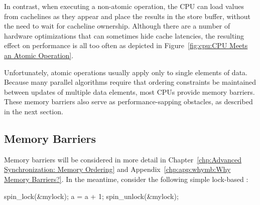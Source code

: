 In contrast, when executing a non-atomic operation, the CPU can load
values from cachelines as they appear and place the results in the
store buffer, without the need to wait for cacheline ownership.
Although there are a number of hardware optimizations that can sometimes
hide cache latencies, the resulting effect on performance is all too
often as depicted in
Figure~\ref{fig:cpu:CPU Meets an Atomic Operation}.

Unfortunately, atomic operations usually apply only to single elements
of data.
Because many parallel algorithms require that ordering constraints
be maintained between updates of multiple data elements, most CPUs
provide memory barriers.
These memory barriers also serve as performance-sapping obstacles,
as described in the next section.

\QuickQuizEnd

\subsection{Memory Barriers}
\label{sec:cpu:Memory Barriers}

Memory barriers will be considered in more detail in
Chapter~\ref{chp:Advanced Synchronization: Memory Ordering} and
Appendix~\ref{chp:app:whymb:Why Memory Barriers?}.
In the meantime, consider the following simple lock-based :

\begin{VerbatimN}
spin_lock(&mylock);
a = a + 1;
spin_unlock(&mylock);
\end{VerbatimN}


